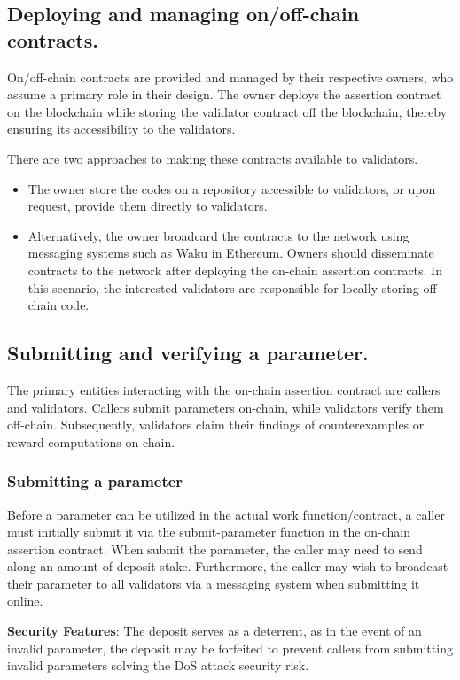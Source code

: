 \documentclass[runningheads]{llncs}
\begin{document}
\subsection{Deploying and managing on/off-chain contracts.}
On/off-chain contracts are provided and managed by their respective owners, who assume a primary role in their design. The owner deploys the assertion contract on the blockchain while storing the validator contract off the blockchain, thereby ensuring its accessibility to the validators.

There are two approaches to making these contracts available to validators.
\begin{itemize}
\item The owner store the codes on a repository accessible to validators, or upon request, provide them directly to validators.
\item Alternatively, the owner broadcard the contracts to the network using messaging systems such as Waku in Ethereum. Owners should disseminate contracts to the network after deploying the on-chain assertion contracts. In this scenario, the interested validators are responsible for locally storing off-chain code.
\end{itemize}

\subsection{Submitting and verifying a parameter.} The primary entities interacting with the on-chain assertion contract are callers and validators. Callers submit parameters on-chain, while validators verify them off-chain. Subsequently, validators claim their findings of counterexamples or reward computations on-chain. 
\subsubsection{Submitting a parameter} 
Before a parameter can be utilized in the actual work function/contract, a caller must initially submit it via the submit-parameter function in the on-chain assertion contract. When submit the parameter, the caller may need to send along an amount of deposit stake. Furthermore, the caller may wish to broadcast their parameter to all validators via a messaging system when submitting it online.

\textbf{Security Features}: 
The deposit serves as a deterrent, as in the event of an invalid parameter, the deposit may be forfeited to prevent callers from submitting invalid parameters solving the DoS attack security risk. 
\end{document}
